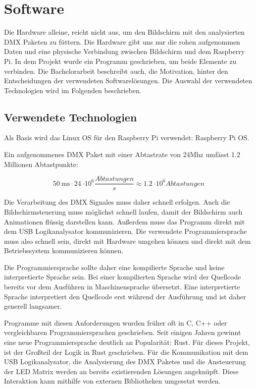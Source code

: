 \chapter{Software}

Die Hardware alleine, reicht nicht aus, um den Bildschirm mit den analysierten DMX Paketen zu füttern. Die Hardware gibt uns nur die rohen aufgenommen Daten und eine physische Verbindung zwischen Bildschirm und dem Raspberry Pi. In dem Projekt wurde ein Programm geschrieben, um beide Elemente zu verbinden. Die Bachelorarbeit beschreibt auch, die Motivation, hinter den Entscheidungen der verwendeten Softwarelösungen. Die Auswahl der verwendeten Technologien wird im Folgenden beschrieben.

\section{Verwendete Technologien}
Als Basis wird das Linux OS für den Raspberry Pi verwendet: Raspberry Pi OS.

Ein aufgenommenes DMX Paket mit einer Abtastrate von 24Mhz umfässt 1.2 Millionen Abtastpunkte:

\[\SI{50}{\ms} \cdot \SI{24}{\cdot 10^6 \frac{Abtastungen}{s}} \approx \SI{1.2}{\cdot 10^6 Abtastungen}\]

Die Verarbeitung des DMX Signales muss daher schnell erfolgen. Auch die Bildschirmsteuerung muss möglichst schnell laufen, damit der Bildschirm auch Animationen flüssig darstellen kann. Außerdem muss das Programm direkt mit dem USB Logikanalysator kommunizieren. Die verwendete Programmiersprache muss also schnell sein, direkt mit Hardware umgehen können und direkt mit dem Betriebssystem kommunizieren können.

Die Programmiersprache sollte daher eine kompilierte Sprache und keine interpretierte Sprache sein. Bei einer kompilierten Sprache wird der Quellcode bereits vor dem Ausführen in Maschinensprache übersetzt. Eine interpretierte Sprache interpretiert den Quellcode erst während der Ausführung und ist daher generell langsamer.

Programme mit diesen Anforderungen wurden früher oft in C, C++ oder vergleichbaren Programmiersprachen geschrieben. Seit einigen Jahren gewinnt eine neue Programmiersprache deutlich an Popularität: Rust. Für dieses Projekt, ist der Großteil der Logik in Rust geschrieben.
Für die Kommunikation mit dem USB Logikanalysator, die Analysierung des DMX Paketes und die Ansteuerung der LED Matrix werden an bereits existierenden Lösungen angeknüpft. Diese Interaktion kann mithilfe von externen Bibliotheken umgesetzt werden.

